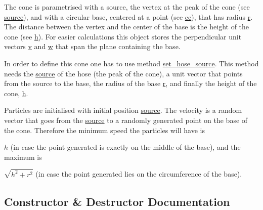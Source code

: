 The cone is parametrised with a source, the vertex at the peak of the cone (see \hyperlink{classphysim_1_1emitters_1_1free__emitters_1_1hose_a0b4f4a66f8eda0638692f3f45e301cd1}{source}), and with a circular base, centered at a point (see \hyperlink{classphysim_1_1emitters_1_1free__emitters_1_1hose_ace1e6f8f24a7d1649be59e40234fc1ed}{cc}), that has radius \hyperlink{classphysim_1_1emitters_1_1free__emitters_1_1hose_af89bf89e98c1670556734022e034f2aa}{r}. The distance between the vertex and the center of the base is the height of the cone (see \hyperlink{classphysim_1_1emitters_1_1free__emitters_1_1hose_ac1398640d981dd745b8d26e72bc7fe40}{h}). For easier calculations this object stores the perpendicular unit vectors \hyperlink{classphysim_1_1emitters_1_1free__emitters_1_1hose_a3a849102db9771fe37143abec55f29f7}{v} and \hyperlink{classphysim_1_1emitters_1_1free__emitters_1_1hose_a2c408a7344d516cd74a57250e8d708e2}{w} that span the plane containing the base.

In order to define this cone one has to use method \hyperlink{classphysim_1_1emitters_1_1free__emitters_1_1hose_aeffa7bc72509d3ae1262244815f97737}{set\+\_\+hose\+\_\+source}. This method needs the \hyperlink{classphysim_1_1emitters_1_1free__emitters_1_1hose_a0b4f4a66f8eda0638692f3f45e301cd1}{source} of the hose (the peak of the cone), a unit vector that points from the source to the base, the radius of the base \hyperlink{classphysim_1_1emitters_1_1free__emitters_1_1hose_af89bf89e98c1670556734022e034f2aa}{r}, and finally the height of the cone, \hyperlink{classphysim_1_1emitters_1_1free__emitters_1_1hose_ac1398640d981dd745b8d26e72bc7fe40}{h}.

Particles are initialised with initial position \hyperlink{classphysim_1_1emitters_1_1free__emitters_1_1hose_a0b4f4a66f8eda0638692f3f45e301cd1}{source}. The velocity is a random vector that goes from the \hyperlink{classphysim_1_1emitters_1_1free__emitters_1_1hose_a0b4f4a66f8eda0638692f3f45e301cd1}{source} to a randomly generated point on the base of the cone. Therefore the minimum speed the particles will have is
\begin{DoxyItemize}
\item $h$ (in case the point generated is exactly on the middle of the base), and the maximum is
\item $\sqrt{h^2 + r^2}$ (in case the point generated lies on the circumference of the base). 
\end{DoxyItemize}

\subsection{Constructor \& Destructor Documentation}
\mbox{\label{classphysim_1_1emitters_1_1free__emitters_1_1hose_ad20ae14c9c19227c1555fa9ce7f58891}} 
